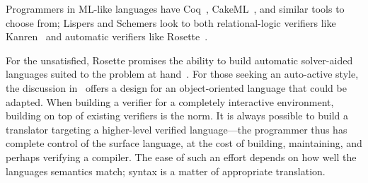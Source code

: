Programmers in ML-like languages have Coq~\cite{Coq}, CakeML~\cite{Kumar_2014},
and similar tools to choose from; Lispers and Schemers look to both
relational-logic verifiers like Kanren~\cite{Byrd_2009} and automatic verifiers
like Rosette~\cite{Rosette}.

For the unsatisfied, Rosette promises the ability to build automatic
solver-aided languages suited to the problem at hand~\cite{Torlak_2013}. For
those seeking an auto-active style, the discussion
in~\cite{leino2008specification} offers a design for an object-oriented language
that could be adapted. When building a verifier for a completely interactive
environment, building on top of existing verifiers is the norm. It is always
possible to build a translator targeting a higher-level verified language---the
programmer thus has complete control of the surface language, at the cost of
building, maintaining, and perhaps verifying a compiler. The ease of such an
effort depends on how well the languages semantics match; syntax is a matter of
appropriate translation.
